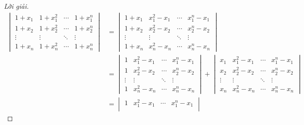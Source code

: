 \begin{proof}[Lời giải]
    \begingroup{}
    \allowdisplaybreaks{}
    \begin{align*}
        \begin{vmatrix}
            1 + x_{1} & 1 + x_{1}^{2} & \cdots & 1 + x_{1}^{n} \\
            1 + x_{2} & 1 + x_{2}^{2} & \cdots & 1 + x_{2}^{n} \\
            \vdots    & \vdots        & \ddots & \vdots        \\
            1 + x_{n} & 1 + x_{n}^{2} & \cdots & 1 + x_{n}^{n}
        \end{vmatrix}
         & =
        \begin{vmatrix}
            1 + x_{1} & x_{1}^{2} - x_{1} & \cdots & x_{1}^{n} - x_{1} \\
            1 + x_{2} & x_{2}^{2} - x_{2} & \cdots & x_{2}^{n} - x_{2} \\
            \vdots    & \vdots            & \ddots & \vdots            \\
            1 + x_{n} & x_{n}^{2} - x_{n} & \cdots & x_{n}^{n} - x_{n}
        \end{vmatrix}                                   \\
         & =
        \begin{vmatrix}
            1      & x_{1}^{2} - x_{1} & \cdots & x_{1}^{n} - x_{1} \\
            1      & x_{2}^{2} - x_{2} & \cdots & x_{2}^{n} - x_{2} \\
            \vdots & \vdots            & \ddots & \vdots            \\
            1      & x_{n}^{2} - x_{n} & \cdots & x_{n}^{n} - x_{n}
        \end{vmatrix}
        +
        \begin{vmatrix}
            x_{1}  & x_{1}^{2} - x_{1} & \cdots & x_{1}^{n} - x_{1} \\
            x_{2}  & x_{2}^{2} - x_{2} & \cdots & x_{2}^{n} - x_{2} \\
            \vdots & \vdots            & \ddots & \vdots            \\
            x_{n}  & x_{n}^{2} - x_{n} & \cdots & x_{n}^{n} - x_{n}
        \end{vmatrix}                                      \\
         & =
        \begin{vmatrix}
            1      & x_{1}^{2} - x_{1} & \cdots & x_{1}^{n} - x_{1} \\

\end{vmatrix}
\end{align*}
\end{proof}
